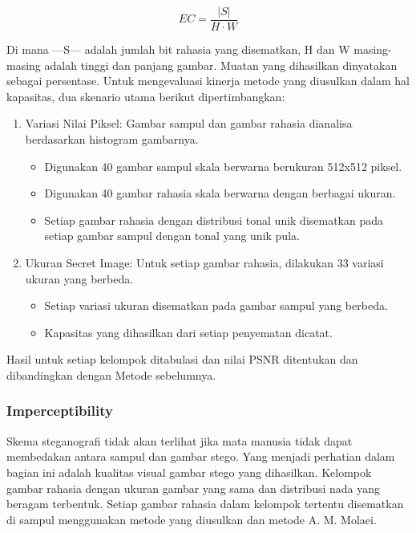 \documentclass{ittelkom}
\begin{document}
\begin{equation}
    EC = \frac{|S|}{H \cdot W}
\end{equation}

Di mana —S— adalah jumlah bit rahasia yang disematkan, H dan W masing-masing
adalah tinggi dan panjang gambar. Muatan yang dihasilkan dinyatakan sebagai
persentase. Untuk mengevaluasi kinerja metode yang diusulkan dalam hal
kapasitas, dua skenario utama berikut dipertimbangkan:

\begin{enumerate}
    \item Variasi Nilai Piksel: Gambar sampul dan gambar rahasia dianalisa berdasarkan
          histogram gambarnya.
          \begin{itemize}
              \item Digunakan 40 gambar sampul skala berwarna berukuran 512x512 piksel.
              \item Digunakan 40 gambar rahasia skala berwarna dengan berbagai ukuran.
              \item Setiap gambar rahasia dengan distribusi tonal unik disematkan pada setiap
                    gambar sampul dengan tonal yang unik pula.
          \end{itemize}
    \item Ukuran Secret Image: Untuk setiap gambar rahasia, dilakukan 33 variasi ukuran
          yang berbeda.
          \begin{itemize}
              \item Setiap variasi ukuran disematkan pada gambar sampul yang berbeda.
              \item Kapasitas yang dihasilkan dari setiap penyematan dicatat.
          \end{itemize}
\end{enumerate}

Hasil untuk setiap kelompok ditabulasi dan nilai PSNR ditentukan dan
dibandingkan dengan Metode sebelumnya.

\subsubsection{Imperceptibility}


Skema steganografi tidak akan terlihat jika mata manusia tidak dapat membedakan
antara sampul dan gambar stego. Yang menjadi perhatian dalam bagian ini adalah
kualitas visual gambar stego yang dihasilkan. Kelompok gambar rahasia dengan
ukuran gambar yang sama dan distribusi nada yang beragam terbentuk. Setiap
gambar rahasia dalam kelompok tertentu disematkan di sampul menggunakan metode
yang diusulkan dan metode A. M. Molaei.
\end{document}
